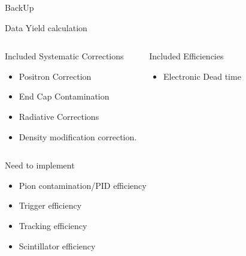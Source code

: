\documentclass{beamer}
\begin{document}
\begin{frame}{}
\Huge{\centerline{BackUp}}
\end{frame}
\begin{frame}{Data Yield calculation}
	\begin{columns}
	\begin{block}{Included Systematic Corrections}
		\begin{itemize}
			\item Positron Correction
			\item End Cap Contamination 
			\item Radiative Corrections
			\item Density modification correction. 
		\end{itemize}	
	\end{block}
	\begin{block}{Included Efficiencies}
		\begin{itemize}
			\item Electronic Dead time
		\end{itemize}	
	\end{block}
	\end{columns}
	\begin{block}{Need to implement}
		\begin{itemize}
			\item Pion contamination/PID efficiency
			\item Trigger efficiency
			\item Tracking efficiency  
			\item Scintillator efficiency  
		\end{itemize}	
	\end{block}
	
\end{frame}
\end{document}
